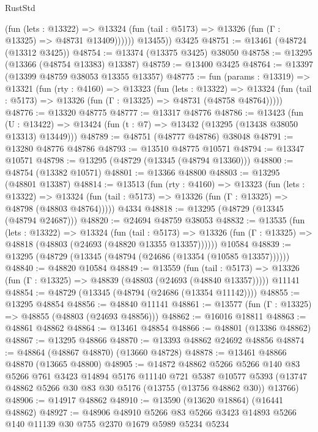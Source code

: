 \begin{lexlean}{RustStd}
\begin{coremodule}
              (fun (lets : @13322) =>
              @13324 (fun (tail : @5173) => @13326 (fun (Γ : @13325) => @48731 @13409))))))
        @13455))
    @3425
@48751 := @13461 (@48724 (@13312 @3425))
@48754 := @13374 (@13375 @3425) @38050
@48758 := @13295 (@13366 (@48754 @13383) @13387)
@48759 := @13400 @3425
@48764 := @13397 (@13399 @48759 @38053 @13355 @13357)
@48775 := fun (params : @13319) =>
  @13321
    (fun (rty : @4160) =>
    @13323
      (fun (lets : @13322) =>
      @13324 (fun (tail : @5173) => @13326 (fun (Γ : @13325) => @48731 (@48758 @48764)))))
@48776 := @13320 @48775
@48777 := @13317 @48776
@48786 := @13423
    (fun (U : @13422) => @13424 (fun (t : @7) => @13432 (@13295 (@13438 @38050 @13313) @13449)))
@48789 := @48751 (@48777 @48786) @38048
@48791 := @13280 @48776 @48786
@48793 := @13510 @48775 @10571
@48794 := @13347 @10571
@48798 := @13295 (@48729 (@13345 (@48794 @13360)))
@48800 := @48754 (@13382 @10571)
@48801 := @13366 @48800
@48803 := @13295 (@48801 @13387)
@48814 := @13513
    (fun (rty : @4160) =>
    @13323
      (fun (lets : @13322) =>
      @13324 (fun (tail : @5173) => @13326 (fun (Γ : @13325) => @48798 (@48803 @48764)))))
    @4334
@48818 := @13295 (@48729 (@13345 (@48794 @24687)))
@48820 := @24694 @48759 @38053
@48832 := @13535
    (fun (lets : @13322) =>
    @13324
      (fun (tail : @5173) =>
      @13326 (fun (Γ : @13325) => @48818 (@48803 (@24693 (@48820 @13355 @13357))))))
    @10584
@48839 := @13295 (@48729 (@13345 (@48794 (@24686 (@13354 (@10585 @13357))))))
@48840 := @48820 @10584
@48849 := @13559
    (fun (tail : @5173) => @13326 (fun (Γ : @13325) => @48839 (@48803 (@24693 (@48840 @13357)))))
    @11141
@48854 := @48729 (@13345 (@48794 (@24686 (@13354 @11142))))
@48855 := @13295 @48854
@48856 := @48840 @11141
@48861 := @13577 (fun (Γ : @13325) => @48855 (@48803 (@24693 @48856)))
@48862 := @16016 @18811
@48863 := @48861 @48862
@48864 := @13461 @48854
@48866 := @48801 (@13386 @48862)
@48867 := @13295 @48866
@48870 := @13393 @48862 @24692 @48856
@48874 := @48864 (@48867 @48870) (@13660 @48728)
@48878 := @13461 @48866 @48870 (@13665 @48800)
@48905 := @14872
    @48862
    @5266
    @5266
    @140
    @83
    @5266
    @761
    @3423
    @14894
    @5176
    @11140
    @721
    @5387
    @10577
    @5393
    (@13747 @48862 @5266 @30 @83 @30 @5176 (@13755 (@13756 @48862 @30)) @13766)
@48906 := @14917 @48862
@48910 := @13590 (@13620 @18864) (@16441 @48862)
@48927 := @48906
    @48910
    @5266
    @83
    @5266
    @3423
    @14893
    @5266
    @140
    @11139
    @30
    @755
    @2370
    @1679
    @5989
    @5234
    @5234

\end{coremodule}
\end{lexlean}
